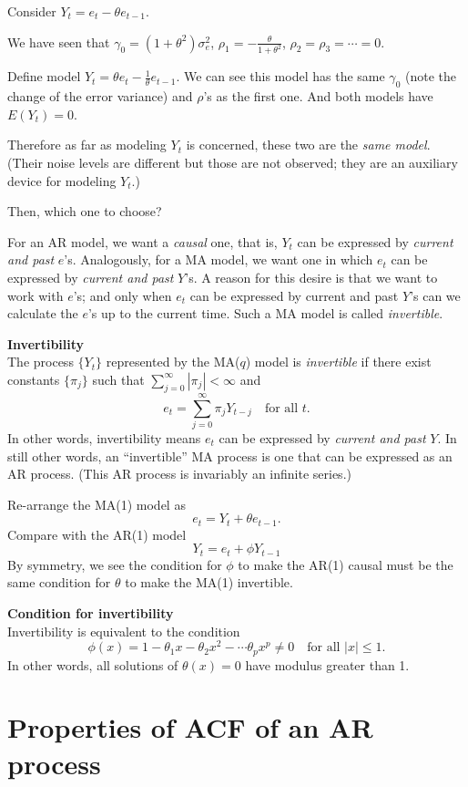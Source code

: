 \documentclass[12pt]{article}
\begin{document}
Consider $Y_t = e_t - \theta e_{t-1}$.

We have seen that
$\gamma_0 = (1 + \theta^2) \sigma^2_e$,
$\rho_1 = -\frac{\theta}{1 + \theta^2}$,
$\rho_2 = \rho_3 = \dotsb = 0$.

Define model
$Y_t = \theta e_t - \frac{1}{\theta} e_{t-1}$.
We can see this model has the same
$\gamma_0$ (note the change of the error variance)
and $\rho$'s as the first one.
And both models have $E(Y_t) = 0$.

Therefore as far as modeling $Y_t$ is concerned,
these two are the \emph{same model}.
(Their noise levels are different but those are not observed;
they are an auxiliary device for modeling $Y_t$.)

Then, which one to choose?

For an AR model,
we want a \emph{causal} one, that is,
$Y_t$ can be expressed by \emph{current and past} $e$'s.
Analogously,
for a MA model,
we want one in which
$e_t$ can be expressed by \emph{current and past} $Y$'s.
A reason for this desire is that we want to work with $e$'s;
and only when $e_t$ can be expressed by current and past $Y$'s can
we calculate the $e$'s up to the current time.
Such a MA model is called \emph{invertible}.

\textbf{Invertibility}\\
The process $\{Y_t\}$ represented by
the MA($q$) model is \emph{invertible}
if there exist constants $\{\pi_j\}$ such that
$\sum_{j=0}^\infty |\pi_j| < \infty$ and
\[
e_t = \sum_{j=0}^\infty \pi_j Y_{t-j}
\quad
\text{for all $t$.}
\]
In other words,
invertibility means $e_t$ can be expressed by \emph{current and past} $Y$.
In still other words,
an ``invertible'' MA process is one that can be expressed as an AR process.
(This AR process is invariably an infinite series.)

Re-arrange the MA(1) model as
\[
e_t = Y_t + \theta e_{t-1}.
\]
Compare with the AR(1) model
\[
Y_t = e_t + \phi Y_{t-1}
\]
By symmetry, we see
the condition for $\phi$ to make the AR(1) causal
must be the same
condition for $\theta$ to make the MA(1) invertible.

\theorem
\textbf{Condition for invertibility}\\
Invertibility is equivalent to the condition
\[
\phi(x) = 1 - \theta_1x - \theta_2x^2 - \dotsb \theta_p x^p \ne 0
\quad
\text{for all $|x| \le 1$.}
\]
In other words,
all solutions of $\theta(x) = 0$ have modulus greater than 1.


\section{Properties of ACF of an AR process}
\end{document}
